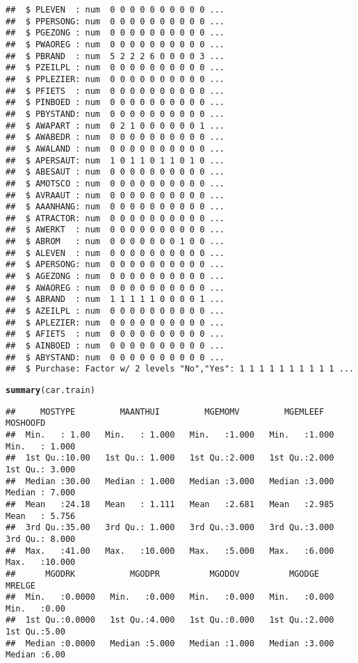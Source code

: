 \documentclass{article}\usepackage[]{graphicx}\usepackage[]{xcolor}
\makeatletter
\newcommand{\hlstd}[1]{\textcolor[rgb]{0.345,0.345,0.345}{#1}}%
\newcommand{\hlkwd}[1]{\textcolor[rgb]{0.737,0.353,0.396}{\textbf{#1}}}%
\newenvironment{kframe}{%
 \def\at@end@of@kframe{}%
 \ifinner\ifhmode%
  \def\at@end@of@kframe{\end{minipage}}%
  \begin{minipage}{\columnwidth}%
 \fi\fi%
 \def\FrameCommand##1{\hskip\@totalleftmargin \hskip-\fboxsep
 \colorbox{shadecolor}{##1}\hskip-\fboxsep
     \hskip-\linewidth \hskip-\@totalleftmargin \hskip\columnwidth}%
 \MakeFramed {\advance\hsize-\width
   \@totalleftmargin\z@ \linewidth\hsize
   \@setminipage}}%
 {\par\unskip\endMakeFramed%
 \at@end@of@kframe}
\newenvironment{knitrout}{}{} %
\makeatother
\begin{document}
\begin{knitrout}
\begin{kframe}
\begin{verbatim}
##  $ PLEVEN  : num  0 0 0 0 0 0 0 0 0 0 ...
##  $ PPERSONG: num  0 0 0 0 0 0 0 0 0 0 ...
##  $ PGEZONG : num  0 0 0 0 0 0 0 0 0 0 ...
##  $ PWAOREG : num  0 0 0 0 0 0 0 0 0 0 ...
##  $ PBRAND  : num  5 2 2 2 6 0 0 0 0 3 ...
##  $ PZEILPL : num  0 0 0 0 0 0 0 0 0 0 ...
##  $ PPLEZIER: num  0 0 0 0 0 0 0 0 0 0 ...
##  $ PFIETS  : num  0 0 0 0 0 0 0 0 0 0 ...
##  $ PINBOED : num  0 0 0 0 0 0 0 0 0 0 ...
##  $ PBYSTAND: num  0 0 0 0 0 0 0 0 0 0 ...
##  $ AWAPART : num  0 2 1 0 0 0 0 0 0 1 ...
##  $ AWABEDR : num  0 0 0 0 0 0 0 0 0 0 ...
##  $ AWALAND : num  0 0 0 0 0 0 0 0 0 0 ...
##  $ APERSAUT: num  1 0 1 1 0 1 1 0 1 0 ...
##  $ ABESAUT : num  0 0 0 0 0 0 0 0 0 0 ...
##  $ AMOTSCO : num  0 0 0 0 0 0 0 0 0 0 ...
##  $ AVRAAUT : num  0 0 0 0 0 0 0 0 0 0 ...
##  $ AAANHANG: num  0 0 0 0 0 0 0 0 0 0 ...
##  $ ATRACTOR: num  0 0 0 0 0 0 0 0 0 0 ...
##  $ AWERKT  : num  0 0 0 0 0 0 0 0 0 0 ...
##  $ ABROM   : num  0 0 0 0 0 0 0 1 0 0 ...
##  $ ALEVEN  : num  0 0 0 0 0 0 0 0 0 0 ...
##  $ APERSONG: num  0 0 0 0 0 0 0 0 0 0 ...
##  $ AGEZONG : num  0 0 0 0 0 0 0 0 0 0 ...
##  $ AWAOREG : num  0 0 0 0 0 0 0 0 0 0 ...
##  $ ABRAND  : num  1 1 1 1 1 0 0 0 0 1 ...
##  $ AZEILPL : num  0 0 0 0 0 0 0 0 0 0 ...
##  $ APLEZIER: num  0 0 0 0 0 0 0 0 0 0 ...
##  $ AFIETS  : num  0 0 0 0 0 0 0 0 0 0 ...
##  $ AINBOED : num  0 0 0 0 0 0 0 0 0 0 ...
##  $ ABYSTAND: num  0 0 0 0 0 0 0 0 0 0 ...
##  $ Purchase: Factor w/ 2 levels "No","Yes": 1 1 1 1 1 1 1 1 1 1 ...
\end{verbatim}
\begin{alltt}
\hlkwd{summary}\hlstd{(car.train)}
\end{alltt}
\begin{verbatim}
##     MOSTYPE         MAANTHUI         MGEMOMV         MGEMLEEF        MOSHOOFD     
##  Min.   : 1.00   Min.   : 1.000   Min.   :1.000   Min.   :1.000   Min.   : 1.000  
##  1st Qu.:10.00   1st Qu.: 1.000   1st Qu.:2.000   1st Qu.:2.000   1st Qu.: 3.000  
##  Median :30.00   Median : 1.000   Median :3.000   Median :3.000   Median : 7.000  
##  Mean   :24.18   Mean   : 1.111   Mean   :2.681   Mean   :2.985   Mean   : 5.756  
##  3rd Qu.:35.00   3rd Qu.: 1.000   3rd Qu.:3.000   3rd Qu.:3.000   3rd Qu.: 8.000  
##  Max.   :41.00   Max.   :10.000   Max.   :5.000   Max.   :6.000   Max.   :10.000  
##      MGODRK           MGODPR          MGODOV          MGODGE          MRELGE    
##  Min.   :0.0000   Min.   :0.000   Min.   :0.000   Min.   :0.000   Min.   :0.00  
##  1st Qu.:0.0000   1st Qu.:4.000   1st Qu.:0.000   1st Qu.:2.000   1st Qu.:5.00  
##  Median :0.0000   Median :5.000   Median :1.000   Median :3.000   Median :6.00  

\end{verbatim}
\end{kframe}
\end{knitrout}
\end{document}

